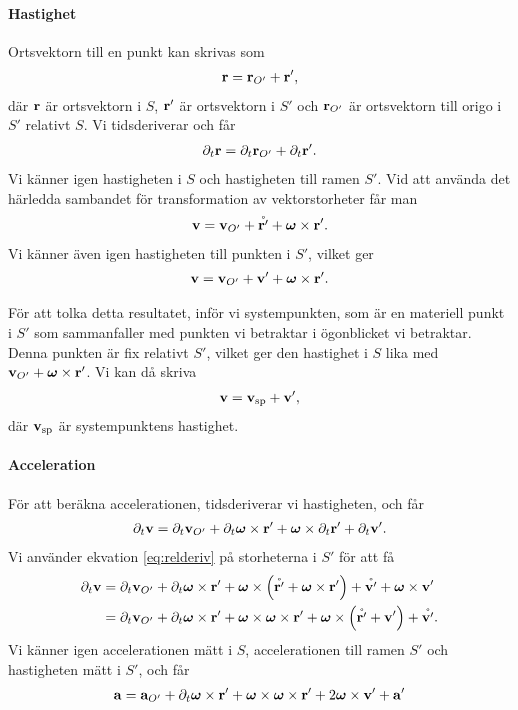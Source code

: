 \paragraph{Hastighet}
Ortsvektorn till en punkt kan skrivas som
\begin{align*}
	\vb{r} = \vb{r}_{O'} + \vb{r}',
\end{align*}
där $\vb{r}$ är ortsvektorn i $S$, $\vb{r}'$ är ortsvektorn i $S'$ och $\vb{r}_{O'}$ är ortsvektorn till origo i $S'$ relativt $S$. Vi tidsderiverar och får
\begin{align*}
	\partial_{t}\vb{r} = \partial_{t}\vb{r}_{O'} + \partial_{t}\vb{r}'.
\end{align*}
Vi känner igen hastigheten i $S$ och hastigheten till ramen $S'$. Vid att använda det härledda sambandet för transformation av vektorstorheter får man
\begin{align*}
	\vb{v} = \vb{v}_{O'} + \mathring{\vb{r}'} + \vb*{\omega}\times\vb{r}'.
\end{align*}
Vi känner även igen hastigheten till punkten i $S'$, vilket ger
\begin{align*}
	\vb{v} = \vb{v}_{O'} + \vb{v}' + \vb*{\omega}\times\vb{r}'.
\end{align*}

För att tolka detta resultatet, inför vi systempunkten, som är en materiell punkt i $S'$ som sammanfaller med punkten vi betraktar i ögonblicket vi betraktar. Denna punkten är fix relativt $S'$, vilket ger den hastighet i $S$ lika med $\vb{v}_{O'} + \vb*{\omega}\times\vb{r}'$. Vi kan då skriva
\begin{align*}
	\vb{v} = \vb{v}_{\text{sp}} + \vb{v}',
\end{align*}
där $\vb{v}_{\text{sp}}$ är systempunktens hastighet.

\paragraph{Acceleration}
För att beräkna accelerationen, tidsderiverar vi hastigheten, och får
\begin{align*}
	\partial_{t}\vb{v} = \partial_{t}\vb{v}_{O'} + \partial_{t}\vb*{\omega}\times\vb{r}' + \vb*{\omega}\times\partial_{t}\vb{r}' + \partial_{t}\vb{v}'.
\end{align*}
Vi använder ekvation \ref{eq:relderiv} på storheterna i $S'$ för att få
\begin{align*}
	\partial_{t}\vb{v} &= \partial_{t}\vb{v}_{O'} + \partial_{t}\vb*{\omega}\times\vb{r}' + \vb*{\omega}\times\left(\mathring{\vb{r}'} + \vb*{\omega}\times\vb{r}'\right) + \mathring{\vb{v}'} + \vb*{\omega}\times\vb{v}' \\
	                &= \partial_{t}\vb{v}_{O'} + \partial_{t}\vb*{\omega}\times\vb{r}' + \vb*{\omega}\times\vb*{\omega}\times\vb{r}' + \vb*{\omega}\times\left(\mathring{\vb{r}'} + \vb{v}'\right) + \mathring{\vb{v}'}.
\end{align*}
Vi känner igen accelerationen mätt i $S$, accelerationen till ramen $S'$ och hastigheten mätt i $S'$, och får
\begin{align*}
	\vb{a} = \vb{a}_{O'} + \partial_{t}\vb*{\omega}\times\vb{r}' + \vb*{\omega}\times\vb*{\omega}\times\vb{r}' + 2\vb*{\omega}\times\vb{v}' + \vb{a}'
\end{align*}

